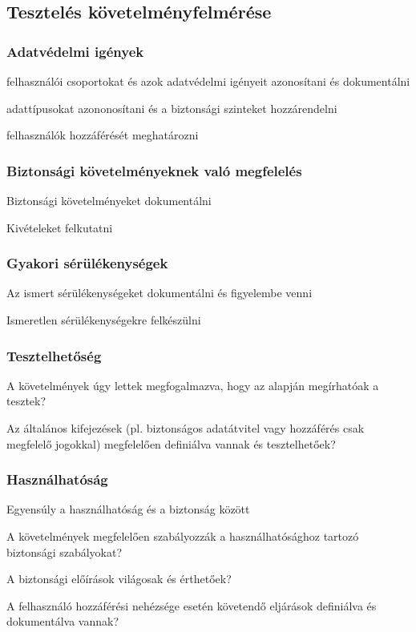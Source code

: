 \documentclass[a4paper,14pt, twocolumn]{extarticle}
\begin{document}
			\subsection{Tesztelés követelményfelmérése}
				\subsubsection{Adatvédelmi igények}
				\begin{compactitem}
					\item felhasználói csoportokat és azok adatvédelmi igényeit azonosítani és dokumentálni \item adattípusokat azononosítani és a biztonsági szinteket hozzárendelni 
					\item felhasználók hozzáférését meghatározni
				\end{compactitem}
			\subsubsection{Biztonsági követelményeknek való megfelelés}
				\begin{compactitem}
					\item Biztonsági követelményeket dokumentálni 
					\item Kivételeket felkutatni
				\end{compactitem}
			\subsubsection{Gyakori sérülékenységek}
				\begin{compactitem}
					\item Az ismert sérülékenységeket dokumentálni és figyelembe venni 
					\item Ismeretlen sérülékenységekre felkészülni
				\end{compactitem}
			\subsubsection{Tesztelhetőség}
				\begin{compactitem}
					\item A követelmények úgy lettek megfogalmazva, hogy az alapján megírhatóak a tesztek? 
					\item Az általános kifejezések (pl. biztonságos adatátvitel vagy hozzáférés csak megfelelő jogokkal) megfelelően definiálva vannak és tesztelhetőek?
				\end{compactitem}
			\subsubsection{Használhatóság}	
				\begin{compactitem}
					\item Egyensúly a használhatóság és a biztonság között 
					\item A követelmények megfelelően szabályozzák a használhatósághoz tartozó biztonsági szabályokat? 
					\item A biztonsági előírások világosak és érthetőek? 
					\item A felhasználó hozzáférési nehézsége esetén követendő eljárások definiálva és dokumentálva vannak?
				\end{compactitem}
\end{document}
